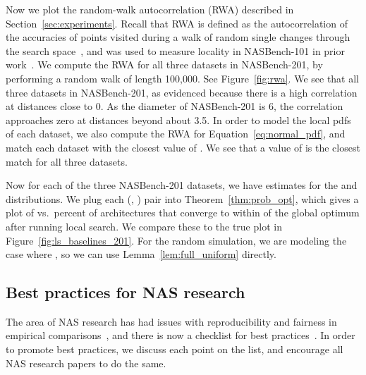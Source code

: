 \documentclass[11pt]{article}
\let\citep\cite
\numberwithin{equation}{section}
\numberwithin{figure}{section}
\theoremstyle{plain}
\theoremstyle{definition}
\begin{document}
Now we plot the random-walk autocorrelation (RWA) described in Section~\ref{sec:experiments}.
Recall that RWA is defined as the 
autocorrelation of the accuracies of points visited during a
walk of random single changes through the 
search space~\citep{weinberger1990correlated, stadler1996landscapes},
and was used to measure locality in NASBench-101 in prior work~\citep{nasbench}.
We compute the RWA for all three datasets in NASBench-201, by performing a random
walk of length 100,000.
See Figure~\ref{fig:rwa}.
We see that all three datasets in NASBench-201, as evidenced because there is a
high correlation at distances close to 0.
As the diameter of NASBench-201 is 6, the correlation approaches zero at distances 
beyond about 3.5.
In order to model the local pdfs of each dataset,
we also compute the RWA for Equation~\ref{eq:normal_pdf}, and match each dataset
with the closest value of .
We see that a value of  is the closest match for all three datasets.


Now for each of the three NASBench-201 datasets, we have estimates for 
the  and 
distributions. We plug each (, ) pair into Theorem~\ref{thm:prob_opt},
which gives a plot of  vs.\ percent of architectures that converge to within
 of the global optimum after running local search.
We compare these to the true plot in Figure~\ref{fig:ls_baselines_201}.
For the random simulation, we are modeling the case where ,
so we can use Lemma~\ref{lem:full_uniform} directly.





\subsection{Best practices for NAS research}
The area of NAS research has had issues with reproducibility and fairness in empirical
comparisons~\citep{randomnas, nasbench}, and there is now a checklist for best 
practices~\citep{lindauer2019best}. In order to promote best practices, we discuss each
point on the list, and encourage all NAS research papers to do the same.
\end{document}
